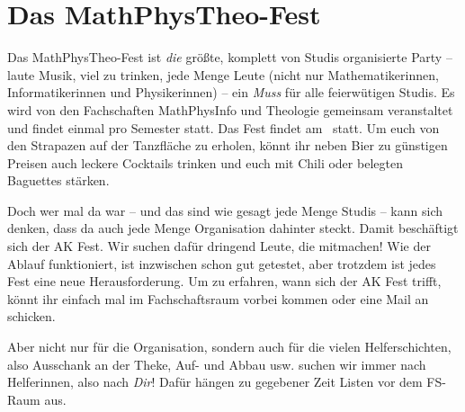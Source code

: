 \section{Das MathPhysTheo-Fest}
Das MathPhysTheo-Fest ist \emph{die} größte, komplett von Studis organisierte Party -- laute Musik, viel zu trinken, jede Menge Leute (nicht nur Mathematikerinnen, Informatikerinnen und Physikerinnen) -- ein \emph{Muss} für alle feierwütigen Studis. Es wird von den Fachschaften MathPhysInfo und Theologie gemeinsam veranstaltet und findet einmal pro Semester statt. Das Fest findet am \mathphystheotermin\ statt. Um euch von den Strapazen auf der Tanzfläche zu erholen, könnt ihr neben Bier zu günstigen Preisen auch leckere Cocktails trinken und euch mit Chili oder belegten Baguettes stärken.

Doch wer mal da war -- und das sind wie gesagt jede Menge Studis -- kann sich denken, dass da auch jede Menge Organisation dahinter steckt. Damit beschäftigt sich der AK Fest. Wir suchen dafür dringend Leute, die mitmachen! Wie der Ablauf funktioniert, ist inzwischen schon gut getestet, aber trotzdem ist jedes Fest eine neue Herausforderung. Um zu erfahren, wann sich der AK Fest trifft, könnt ihr einfach mal im Fachschaftsraum vorbei kommen oder eine Mail an  schicken.

Aber nicht nur für die Organisation, sondern auch für die vielen Helferschichten, also Ausschank an der Theke, Auf- und Abbau usw. suchen wir immer nach Helferinnen, also nach \emph{Dir}! Dafür hängen zu gegebener Zeit Listen vor dem FS-Raum aus.
